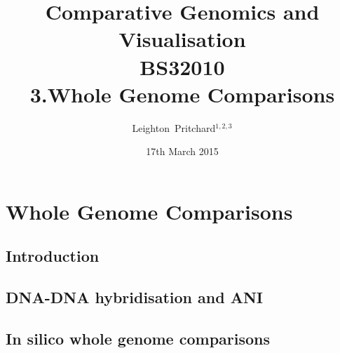 

%



\title[Comparative Genomics and Visualisation: 3.Whole Genomes] %
{Comparative Genomics and \\ Visualisation \\
BS32010 \\
3.Whole Genome Comparisons}
\author[Pritchard] %
{Leighton~Pritchard$^{1,2,3}$}
\date[17th March 2015] %
{17th March 2015}
\subject{Bioinformatics, Genomics, Bacteria, Sequencing, Microbiology, Microbes, Comparative Genomics, Visualisation}





\frame[plain]{\titlepage}



\section{Whole Genome Comparisons}
\subsection{Introduction}

\subsection{DNA-DNA hybridisation and ANI}

\subsection{In silico whole genome comparisons}
%




